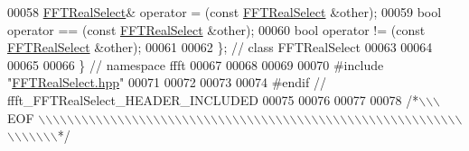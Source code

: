 \begin{DoxyCode}
00058     \hyperlink{a00015}{FFTRealSelect}& operator = (\textcolor{keyword}{const} \hyperlink{a00015}{FFTRealSelect} &other);
00059     \textcolor{keywordtype}{bool}                operator == (\textcolor{keyword}{const} \hyperlink{a00015}{FFTRealSelect} &other);
00060     \textcolor{keywordtype}{bool}                operator != (\textcolor{keyword}{const} \hyperlink{a00015}{FFTRealSelect} &other);
00061 
00062 \};  \textcolor{comment}{// class FFTRealSelect}
00063 
00064 
00065 
00066 \}   \textcolor{comment}{// namespace ffft}
00067 
00068 
00069 
00070 \textcolor{preprocessor}{#include    "\hyperlink{a00105}{FFTRealSelect.hpp}"}
00071 
00072 
00073 
00074 \textcolor{preprocessor}{#endif  // ffft\_FFTRealSelect\_HEADER\_INCLUDED}
00075 
00076 
00077 
00078 \textcolor{comment}{/*\(\backslash\)\(\backslash\)\(\backslash\) EOF \(\backslash\)\(\backslash\)\(\backslash\)\(\backslash\)\(\backslash\)\(\backslash\)\(\backslash\)\(\backslash\)\(\backslash\)\(\backslash\)\(\backslash\)\(\backslash\)\(\backslash\)\(\backslash\)\(\backslash\)\(\backslash\)\(\backslash\)\(\backslash\)\(\backslash\)\(\backslash\)\(\backslash\)\(\backslash\)\(\backslash\)\(\backslash\)\(\backslash\)\(\backslash\)\(\backslash\)\(\backslash\)\(\backslash\)\(\backslash\)\(\backslash\)\(\backslash\)\(\backslash\)\(\backslash\)\(\backslash\)\(\backslash\)\(\backslash\)\(\backslash\)\(\backslash\)\(\backslash\)\(\backslash\)\(\backslash\)\(\backslash\)\(\backslash\)\(\backslash\)\(\backslash\)\(\backslash\)\(\backslash\)\(\backslash\)\(\backslash\)\(\backslash\)\(\backslash\)\(\backslash\)\(\backslash\)\(\backslash\)\(\backslash\)\(\backslash\)\(\backslash\)\(\backslash\)\(\backslash\)\(\backslash\)\(\backslash\)\(\backslash\)\(\backslash\)\(\backslash\)\(\backslash\)*/}
\end{DoxyCode}
